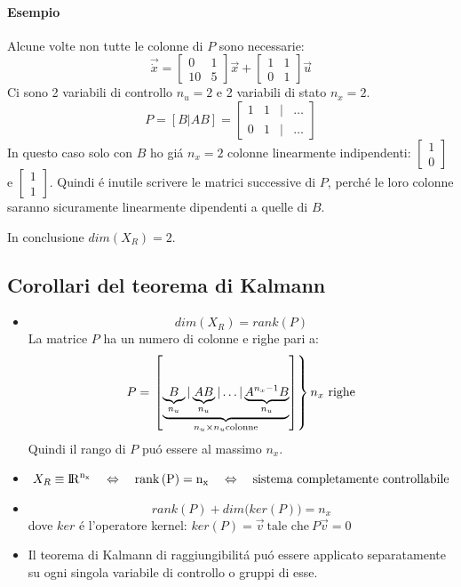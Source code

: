 \documentclass[../main.tex]{subfiles}
\begin{document}
		\begin{mdframed}[style=Esempio]
			\paragraph{Esempio}
			Alcune volte non tutte le colonne di $ P $ sono necessarie:
			\[
				\vec{\dot x} =
				\begin{bmatrix}
					0 & 1\\
					10 & 5
				\end{bmatrix} \vec x +
				\begin{bmatrix}
					1 & 1\\
					0 & 1
				\end{bmatrix} \vec u
			\]
			Ci sono 2 variabili di controllo $ n_u = 2 $ e 2 variabili di stato $ n_x = 2 $.
			\[
				P = \left[ B | AB \right] =
				\begin{bmatrix}
					1 & 1 & | & \dots\\
					0 & 1 & | & \dots
				\end{bmatrix}
			 \]
			 In questo caso solo con $ B $ ho gi\'a $ n_x = 2 $ colonne linearmente indipendenti: $ \begin{bmatrix} 1\\ 0 \end{bmatrix} $ e $ \begin{bmatrix} 1\\ 1 \end{bmatrix} $. Quindi \'e inutile scrivere le matrici successive di $ P $, perch\'e le loro colonne saranno sicuramente linearmente dipendenti a quelle di $ B $.
			 
			 In conclusione $ dim\left( X_R \right) = 2 $.
		\end{mdframed}

	\subsection{Corollari del teorema di Kalmann}
		\begin{itemize}
			\item 
				\[ 
					dim\left( X_R \right) = rank\left( P \right) 
				\]
				La matrice $ P $ ha un numero di colonne e righe pari a:
				\[ 
					P = \left. \left[ \underbrace{\underbrace{B}_{n_u} | \underbrace{AB}_{n_u} | \dots | \underbrace{A^{n_x-1} B}_{n_u}}_{n_u \times n_u \text{colonne}} \right] \right\rbrace\text{$ n_x $ righe}
				\]
				Quindi il rango di $ P $ pu\'o essere al massimo $ n_x $.
			\item 
				\[ 
					X_R \equiv \rm I\!R^{n_x} \quad\Leftrightarrow\quad rank\left( P \right) = n_x \quad\Leftrightarrow\quad \text{sistema completamente controllabile}
				\]
			\item 
				\[ 
					rank\left( P \right) + dim \big( ker\left( P \right) \big) = n_x
				\]
				dove $ ker $ \'e l'operatore kernel: $ ker\left( P \right) = \vec v\ \text{tale che}\ P \vec v = 0 $
			\item 
				Il teorema di Kalmann di raggiungibilit\'a pu\'o essere applicato separatamente su ogni singola variabile di controllo o gruppi di esse.
		\end{itemize}
	
\end{document}
